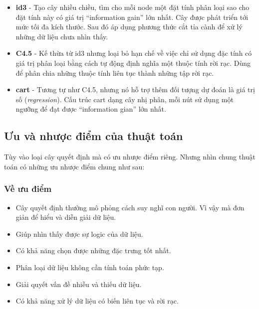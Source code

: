 \documentclass[../main-report.tex]{subfiles}
\begin{document}
\begin{itemize}
\item \textbf{\acrfull{id3}} - Tạo cây nhiều chiều, tìm cho mỗi node một đặt tính phân loại sao cho đặt tính này có giá trị ``information gain'' lớn nhất. Cây được phát triển tới mức tối đa kích thước. Sau đó áp dụng phương thức cắt tỉa cành để xử lý những dữ liệu chưa nhìn thấy.
\item \textbf{C4.5} - Kế thừa từ \acrshort{id3} nhưng loại bỏ hạn chế về việc chỉ sử dụng đặc tính có giá trị phân loại bằng cách tự động định nghĩa một thuộc tính rời rạc. Dùng để phân chia những thuộc tính liên tục thành những tập rời rạc.
\item \textbf{\acrfull{cart}} - Tương tự như C4.5, nhưng nó hỗ trợ thêm đối tượng dự đoán là giá trị số (\emph{\gls{regression}}). Cấu trúc \acrshort{cart} dạng cây nhị phân, mỗi nút sử dụng một ngưỡng để đạt được ``information gian'' lớn nhất.
\end{itemize}

%

\subsection{Ưu và nhược điểm của thuật toán}
Tùy vào loại cây quyết định mà có ưu nhược điểm riêng. Nhưng nhìn chung thuật toán có những ưu nhược điểm chung như sau:
\subsubsection*{Về ưu điểm}
\begin{itemize}
\item Cây quyết định thường mô phỏng cách suy nghĩ con người. Vì vậy mà đơn giản để hiểu và diễn giải dữ liệu.
\item Giúp nhìn thấy được sự logic của dữ liệu.
\item Có khả năng chọn được những đặc trưng tốt nhất.
\item Phân loại dữ liệu không cần tính toán phức tạp.
\item Giải quyết vấn đề nhiễu và thiếu dữ liệu.
\item Có khả năng xử lý dữ liệu có biến liên tục và rời rạc.
\end{itemize}
\end{document}

